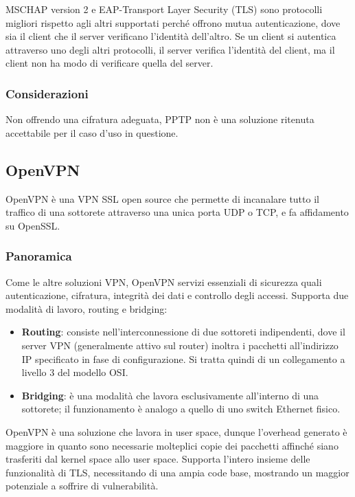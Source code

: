 MSCHAP version 2 e EAP-Transport Layer Security (TLS) sono protocolli migliori rispetto agli altri supportati perché offrono mutua autenticazione, dove sia il client che il server verificano l'identità dell'altro. Se un client si autentica attraverso uno degli altri protocolli, il server verifica l'identità del client, ma il client non ha modo di verificare quella del server.

\subsubsection{Considerazioni}
Non offrendo una cifratura adeguata, PPTP non è una soluzione ritenuta accettabile per il caso d'uso in questione.

\subsection{OpenVPN}
OpenVPN è una VPN SSL open source che permette di incanalare tutto il traffico di una sottorete attraverso una unica porta UDP o TCP, e fa affidamento su OpenSSL.
\subsubsection{Panoramica}
Come le altre soluzioni VPN, OpenVPN servizi essenziali di sicurezza quali autenticazione, cifratura, integrità dei dati e controllo degli accessi.
Supporta due modalità di lavoro, routing e bridging:
\begin{itemize}
    \item \textbf{Routing}: consiste nell'interconnessione di due sottoreti indipendenti, dove il server VPN (generalmente attivo sul router) inoltra i pacchetti all'indirizzo IP specificato in fase di configurazione. Si tratta quindi di un collegamento a livello $3$ del modello OSI.
    \item \textbf{Bridging}: è una modalità che lavora esclusivamente all'interno di una sottorete; il funzionamento è analogo a quello di uno switch Ethernet fisico.
\end{itemize}

OpenVPN è una soluzione che lavora in user space, dunque l'overhead generato è maggiore in quanto sono necessarie molteplici copie dei pacchetti affinché siano trasferiti dal kernel space allo user space. Supporta l'intero insieme delle funzionalità di TLS, necessitando di una ampia code base, mostrando un maggior potenziale a soffrire di vulnerabilità.

